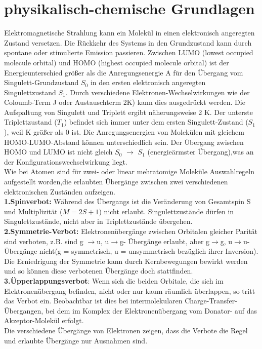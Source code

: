 \section{physikalisch-chemische Grundlagen}
Elektromagnetische Strahlung kann ein Molekül in einen elektronisch angeregten Zustand versetzen. Die Rückkehr des Systems in den Grundzustand kann durch spontane oder stimulierte Emission passieren.
Zwischen LUMO (lowest occupied molecule orbital) und HOMO (highest occupied molecule orbital) ist der Energieunterschied größer als die Anregungsenergie A für den Übergang vom Singulett-Grundzustand $S_0$ in den ersten elektronisch angeregten Singulettzustand $S_1$. Durch verschiedene Elektronen-Wechselwirkungen  wie der Coloumb-Term J oder Austauschterm 2K) kann dies ausgedrückt werden. Die Aufspaltung von Singulett und Triplett ergibt näherungsweise 2 K. Der unterste Triplettzustand ($T_1$) befindet sich immer unter dem ersten Singulett-Zustand ($S_1$), weil K größer als 0 ist. Die Anregungsenergien von Molekülen mit gleichem HOMO-LUMO-Abstand können unterschiedlich sein. Der Übergang zwischen HOMO und LUMO ist nicht gleich $S_0$ $\rightarrow$ $S_1$ (energieärmster Übergang),was an der Konfigurationswechselwirkung liegt.
\\Wie bei Atomen sind für zwei- oder linear mehratomige Moleküle Auswahlregeln aufgestellt worden,die erlaubten Übergänge zwischen zwei verschiedenen elektronischen Zuständen aufzeigen.
\\\textbf{1.Spinverbot:} Während des Übergangs ist die Veränderung von Gesamtspin S und Multiplizität ($M=2S+1$) nicht erlaubt. Singulettzustände dürfen in Singulettzustände, nicht aber in Triplettzustände übergehen.
\\\textbf{2.Symmetrie-Verbot:} Elektronenübergänge zwischen Orbitalen gleicher Parität sind verboten, z.B. sind g $\rightarrow$u, u$\rightarrow$g- Übergänge erlaubt, aber g$\rightarrow$g, u$\rightarrow$u-Übergänge nicht(g = symmetrisch, u = unsymmetrisch bezüglich ihrer Inversion). Die Erniedrigung der Symmetrie kann durch Kernbewegungen bewirkt werden und so können diese verbotenen Übergänge doch stattfinden.
\\\textbf{3.Üpperlappungsverbot}: Wenn sich die beiden Orbitale, die sich im Elektronenübergang befinden, nicht oder nur kaum räumlich überlappen, so tritt das Verbot ein. Beobachtbar ist dies bei intermolekularen Charge-Transfer-Übergangen, bei dem im Komplex der Elektronenübergang vom Donator- auf das Akzeptor-Molekül erfolgt.
\\Die verschiedene Übergänge von Elektronen zeigen, dass die Verbote die Regel und erlaubte Übergänge nur Ausnahmen sind. \cite{[2]}

